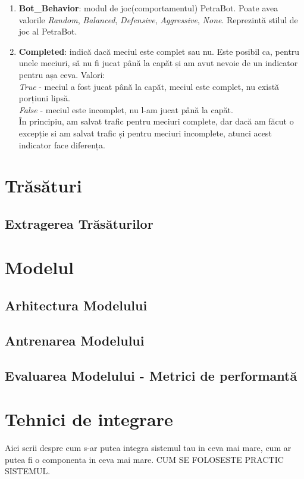 \documentclass[12pt, a4paper, twoside, romanian]{teza-upb}
\begin{document}
\begin{enumerate}
                \item \textbf{Bot\_Behavior}: modul de joc(comportamentul) PetraBot. Poate avea valorile \textit{Random}, \textit{Balanced}, \textit{Defensive}, \textit{Aggressive}, \textit{None}. Reprezintă stilul de joc al PetraBot.

                \item \textbf{Completed}: indică dacă meciul este complet sau nu. Este posibil ca, pentru unele meciuri, să nu fi jucat până la capăt și am avut nevoie de un indicator pentru așa ceva. Valori:\\
                \textit{True} - meciul a fost jucat până la capăt, meciul este complet, nu există porțiuni lipsă.\\
                \textit{False} - meciul este incomplet, nu l-am jucat până la capăt.\\
                În principiu, am salvat trafic pentru meciuri complete, dar dacă am făcut o excepție si am salvat trafic și pentru meciuri incomplete, atunci acest indicator face diferența.
            \end{enumerate}

    \chapter{Trăsături}
        \section{Extragerea Trăsăturilor}
    \chapter{Modelul}
        \section{Arhitectura Modelului}
        \section{Antrenarea Modelului}
        \section{Evaluarea Modelului - Metrici de performantă}
    \chapter{Tehnici de integrare}
        Aici scrii despre cum s-ar putea integra sistemul tau in ceva mai mare, cum ar putea fi o componenta in ceva mai mare. CUM SE FOLOSESTE PRACTIC SISTEMUL.
\end{document}
